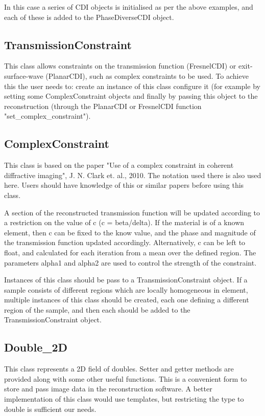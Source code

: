 \documentclass[]{nadia}
\begin{document}
In this case a series of CDI objects is initialised as per the above examples, and each of these is added to the PhaseDiverseCDI object. 

\subsection{TransmissionConstraint}
This class allows constraints on the transmission function
(FresnelCDI) or exit-surface-wave (PlanarCDI), such as complex
constraints to be used. To achieve this the user needs to: create an
instance of this class configure it (for example by setting some
ComplexConstraint objects and finally by passing this object to the
reconstruction (through the PlanarCDI or FresnelCDI function
"set\_complex\_constraint").

\subsection{ComplexConstraint}

This class is based on the paper "Use of a complex constraint in
coherent diffractive imaging", J. N. Clark et. al., 2010. The notation
used there is also used here. Users should have knowledge of this or
similar papers before using this class.

A section of the reconstructed transmission function will be updated
according to a restriction on the value of c (c = beta/delta). If the
material is of a known element, then c can be fixed to the know value,
and the phase and magnitude of the transmission function updated
accordingly. Alternatively, c can be left to float, and calculated for
each iteration from a mean over the defined region. The parameters
alpha1 and alpha2 are used to control the strength of the constraint.

Instances of this class should be pass to a TransmissionConstraint
object. If a sample consists of different regions which are locally
homogeneous in element, multiple instances of this class should be
created, each one defining a different region of the sample, and then
each should be added to the TransmissionConstraint object.

\subsection{Double\_2D}
This class represents a 2D field of doubles. Setter and getter methods
are provided along with some other useful functions. This is a
convenient form to store and pass image data in the reconstruction
software. A better implementation of this class would use templates,
but restricting the type to double is sufficient our needs.
\end{document}
